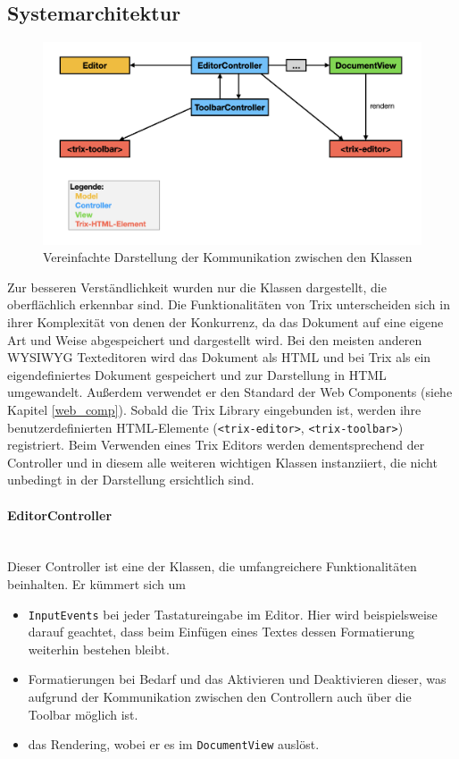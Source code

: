 \subsection{Systemarchitektur}
\begin{figure}[H]
\begin{center}
	\includegraphics[scale=.4]{images/sysarch.png}
\end{center}
	\caption{Vereinfachte Darstellung der Kommunikation zwischen den Klassen}
\end{figure}

Zur besseren Verständlichkeit wurden nur die Klassen dargestellt, die oberflächlich erkennbar sind. Die Funktionalitäten von Trix unterscheiden sich in ihrer Komplexität von denen der Konkurrenz, da das Dokument auf eine eigene Art und Weise abgespeichert und dargestellt wird. Bei den meisten anderen WYSIWYG Texteditoren wird das Dokument als HTML und bei Trix als ein eigendefiniertes Dokument gespeichert und zur Darstellung in HTML umgewandelt. Außerdem verwendet er den Standard der Web Components (siehe Kapitel \ref{web_comp}). Sobald die Trix Library eingebunden ist, werden ihre benutzerdefinierten HTML-Elemente (\texttt{<trix-editor>}, \texttt{<trix-toolbar>}) registriert. Beim Verwenden eines Trix Editors werden dementsprechend der Controller und in diesem alle weiteren wichtigen Klassen instanziiert, die nicht unbedingt in der Darstellung ersichtlich sind. 

\paragraph{EditorController}\mbox{}\\
Dieser Controller ist eine der Klassen, die umfangreichere Funktionalitäten beinhalten. Er kümmert sich um 

\begin{itemize}
	\item \texttt{InputEvents} bei jeder Tastatureingabe im Editor. Hier wird beispielsweise darauf geachtet, dass beim Einfügen eines Textes dessen Formatierung weiterhin bestehen bleibt.
	\item Formatierungen bei Bedarf und das Aktivieren und Deaktivieren dieser, was aufgrund der Kommunikation zwischen den Controllern auch über die Toolbar möglich ist.
	\item das Rendering, wobei er es im \texttt{DocumentView} auslöst.
\end{itemize}

